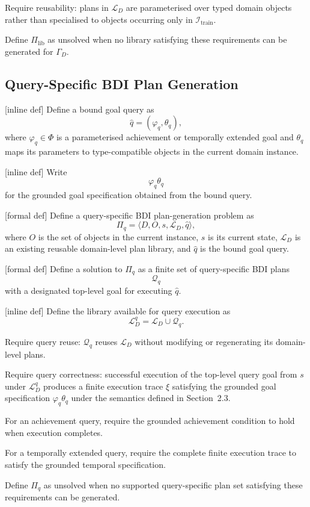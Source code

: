 Require reusability: plans in \(\mathcal{L}_D\) are parameterised over
typed domain objects rather than specialised to objects occurring only
in \(\mathcal{I}_{\mathrm{train}}\).

Define \(\Pi_{\mathrm{lib}}\) as unsolved when no library satisfying
these requirements can be generated for \(\Gamma_D\).


\subsection{Query-Specific BDI Plan Generation}

[inline def] Define a bound goal query as
\[
\widehat{q}
=
(\varphi_q,\theta_q),
\]
where \(\varphi_q\in\Phi\) is a parameterised achievement or temporally
extended goal and \(\theta_q\) maps its parameters to type-compatible
objects in the current domain instance.

[inline def] Write
\[
\varphi_q\theta_q
\]
for the grounded goal specification obtained from the bound query.

[formal def] Define a query-specific BDI plan-generation problem as
\[
\Pi_q
=
\langle
D,
O,
s,
\mathcal{L}_D,
\widehat{q}
\rangle,
\]
where \(O\) is the set of objects in the current instance,
\(s\) is its current state,
\(\mathcal{L}_D\) is an existing reusable domain-level plan library,
and \(\widehat{q}\) is the bound goal query.

[formal def] Define a solution to \(\Pi_q\) as a finite set of
query-specific BDI plans
\[
\mathcal{Q}_q
\]
with a designated top-level goal for executing \(\widehat{q}\).

[inline def] Define the library available for query execution as
\[
\mathcal{L}_D^q
=
\mathcal{L}_D\cup\mathcal{Q}_q.
\]

Require query reuse: \(\mathcal{Q}_q\) reuses
\(\mathcal{L}_D\) without modifying or regenerating its domain-level
plans.

Require query correctness: successful execution of the top-level query
goal from \(s\) under \(\mathcal{L}_D^q\) produces a finite execution
trace \(\xi\) satisfying the grounded goal specification
\(\varphi_q\theta_q\) under the semantics defined in Section~2.3.

For an achievement query, require the grounded achievement condition
to hold when execution completes.

For a temporally extended query, require the complete finite execution
trace to satisfy the grounded temporal specification.

Define \(\Pi_q\) as unsolved when no supported query-specific plan set
satisfying these requirements can be generated.